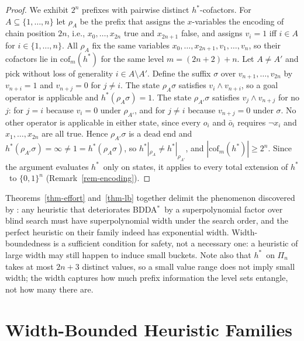 \documentclass[letterpaper]{article}
\newcommand{\task}{\ensuremath{\Pi}}
\newcommand{\hstar}{\ensuremath{h^{*}}}
\newcommand{\sub}[2]{\ensuremath{\mathrm{cof}_{#1}(#2)}}
\newcommand{\bddastar}{BDDA\ensuremath{^{*}}}
\theoremstyle{plain}
\theoremstyle{definition}
\theoremstyle{remark}
\begin{document}
\begin{proof}
We exhibit $2^n$ prefixes with pairwise distinct \hstar-cofactors. For
$A \subseteq \{1, \dots, n\}$ let $\rho_A$ be the prefix that assigns
the $x$-variables the encoding of chain position $2n$, i.e.,
$x_0, \dots, x_{2n}$ true and $x_{2n+1}$ false, and assigns $v_i = 1$
iff $i \in A$ for $i \in \{1, \dots, n\}$. All $\rho_A$ fix the same
variables $x_0, \dots, x_{2n+1}, v_1, \dots, v_n$, so their cofactors
lie in $\sub{m}{\hstar}$ for the same level $m = (2n + 2) + n$. Let
$A \neq A'$ and pick without loss of generality
$i \in A \setminus A'$. Define the suffix $\sigma$ over
$v_{n+1}, \dots, v_{2n}$ by $v_{n+i} = 1$ and $v_{n+j} = 0$ for
$j \neq i$. The state $\rho_A \sigma$ satisfies
$v_i \wedge v_{n+i}$, so a goal operator is applicable and
$\hstar(\rho_A \sigma) = 1$. The state $\rho_{A'} \sigma$ satisfies
$v_j \wedge v_{n+j}$ for no $j$: for $j = i$ because $v_i = 0$ under
$\rho_{A'}$, and for $j \neq i$ because $v_{n+j} = 0$ under $\sigma$.
No other operator is applicable in either state, since every $o_i$ and
$\bar o_i$ requires $\neg x_i$ and $x_1, \dots, x_{2n}$ are all true.
Hence $\rho_{A'} \sigma$ is a dead
end and $\hstar(\rho_{A'} \sigma) = \infty \neq 1 =
\hstar(\rho_A \sigma)$, so
$\hstar|_{\rho_A} \neq \hstar|_{\rho_{A'}}$, and
$|\sub{m}{\hstar}| \geq 2^{n}$. Since the argument evaluates \hstar\
only on states, it applies to every total extension of \hstar\ to
$\{0,1\}^n$ (Remark~\ref{rem-encoding}).
\end{proof}

Theorems~\ref{thm-effort} and~\ref{thm-lb} together delimit the
phenomenon discovered by \citet{speck-et-al-icaps2020}: any heuristic
that deteriorates \bddastar\ by a superpolynomial factor over blind
search must have superpolynomial width under the search order, and the
perfect heuristic on their family indeed has exponential width.
Width-boundedness is a sufficient condition for safety, not a necessary
one: a heuristic of large width may still happen to induce small
buckets. Note also that \hstar\ on $\task_n$ takes at most
$2n + 3$ distinct values, so a small value range does not imply small
width; the width captures how much prefix information the level sets
entangle, not how many there are.

\section{Width-Bounded Heuristic Families}
\label{sec-instances}
\end{document}
